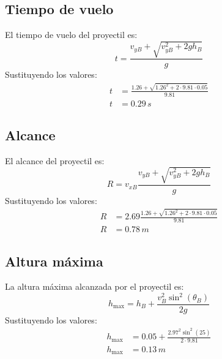 \documentclass{article}
\begin{document}
        \subsection{Tiempo de vuelo}
        El tiempo de vuelo del proyectil es:
        \[
        t = \frac{v_{yB} + \sqrt{v_{yB}^2 + 2 g h_B}}{g}
        \]
        Sustituyendo los valores:
        \begin{align*}
        t &= \frac{ 1.26 + \sqrt{ 1.26^2 + 2 \cdot 9.81 \cdot 0.05 } }{ 9.81 } \\
        t &= 0.29 \, \si{s}
        \end{align*}
        
        \subsection{Alcance}
        El alcance del proyectil es:
        \[
        R = v_{xB} \frac{v_{yB} + \sqrt{v_{yB}^2 + 2gh_B}}{g}
        \]
        Sustituyendo los valores:
        \begin{align*}
        R &= 2.69 \frac{ 1.26 + \sqrt{ 1.26^2 + 2 \cdot 9.81 \cdot 0.05 } }{ 9.81 } \\
        R &= 0.78 \, \si{m}
        \end{align*}
        
        \subsection{Altura máxima}
        La altura máxima alcanzada por el proyectil es:
        \[
        h_{\text{max}} = h_B + \frac{v_B^2 \sin^2(\theta_B)}{2 g}
        \]
        Sustituyendo los valores:
        \begin{align*}
        h_{\text{max}} &= 0.05 + \frac{ 2.97^2 \sin^2(25)}{2 \cdot 9.81} \\
        h_{\text{max}} &= 0.13 \, \si{m}
        \end{align*}
        
        
\end{document}
